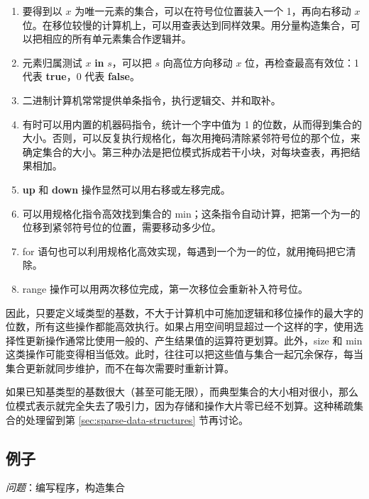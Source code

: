 \begin{enumerate}[wide, nosep, label=(\arabic*)]
	\item 要得到以 $x$ 为唯一元素的集合，可以在符号位位置装入一个 1，再向右移动 $x$ 位。在移位较慢的计算机上，可以用查表达到同样效果。用分量构造集合，可以把相应的所有单元素集合作逻辑并。

	\item 元素归属测试 $x$ \textbf{in} $s$，可以把 $s$ 向高位方向移动 $x$ 位，再检查最高有效位：1 代表 \textbf{true}，0 代表 \textbf{false}。

	\item 二进制计算机常常提供单条指令，执行逻辑交、并和取补。

	\item 有时可以用内置的机器码指令，统计一个字中值为 1 的位数，从而得到集合的大小。否则，可以反复执行规格化，每次用掩码清除紧邻符号位的那个位，来确定集合的大小。第三种办法是把位模式拆成若干小块，对每块查表，再把结果相加。

	\item \textbf{up} 和 \textbf{down} 操作显然可以用右移或左移完成。

	\item 可以用规格化指令高效找到集合的 min；这条指令自动计算，把第一个为一的位移到紧邻符号位的位置，需要移动多少位。

	\item for 语句也可以利用规格化高效实现，每遇到一个为一的位，就用掩码把它清除。

	\item range 操作可以用两次移位完成，第一次移位会重新补入符号位。	
\end{enumerate}

因此，只要定义域类型的基数，不大于计算机中可施加逻辑和移位操作的最大字的位数，所有这些操作都能高效执行。如果占用空间明显超过一个这样的字，使用选择性更新操作通常比使用一般的、产生结果值的运算符更划算。此外，size 和 min 这类操作可能变得相当低效。此时，往往可以把这些值与集合一起冗余保存，每当集合更新就同步维护，而不在每次需要时重新计算。

如果已知基类型的基数很大（甚至可能无限），而典型集合的大小相对很小，那么位模式表示就完全失去了吸引力，因为存储和操作大片零已经不划算。这种稀疏集合的处理留到第 \ref{sec:sparse-data-structures} 节再讨论。

\subsection{例子}

\noindent
\textit{问题}：编写程序，构造集合

